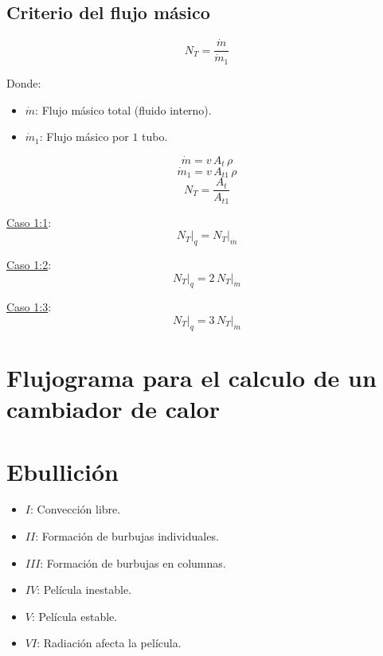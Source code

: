 \subsection{Criterio del flujo másico}

\begin{equation*}
    N_T = \frac{\dot{m}}{\dot{m}_1}
\end{equation*}

Donde:
\begin{itemize}
    \item $\dot{m}$: Flujo másico total (fluido interno).
    \item $\dot{m}_1$: Flujo másico por $1$ tubo.
\end{itemize}

\begin{equation*}
    \dot{m} = v\,A_t\,\rho
\end{equation*}
\begin{equation*}
    \dot{m}_1 = v\,A_{t1}\,\rho
\end{equation*}
\begin{equation*}
    N_T = \frac{A_t}{A_{t1}}
\end{equation*}

\underline{Caso 1:1}:
\begin{equation*}
    N_T\Biggr|_q = N_T\Biggr|_{\dot{m}}
\end{equation*}

\underline{Caso 1:2}:
\begin{equation*}
    N_T\Biggr|_q = 2\,N_T\Biggr|_{\dot{m}}
\end{equation*}

\underline{Caso 1:3}:
\begin{equation*}
    N_T\Biggr|_q = 3\,N_T\Biggr|_{\dot{m}}
\end{equation*}

\section{Flujograma para el calculo de un cambiador de calor}


\section{Ebullición}


\begin{itemize}
    \item $I$: Convección libre.
    \item $II$: Formación de burbujas individuales.
    \item $III$: Formación de burbujas en columnas.
    \item $IV$: Película inestable.
    \item $V$: Película estable.
    \item $VI$: Radiación afecta la película.
\end{itemize}

